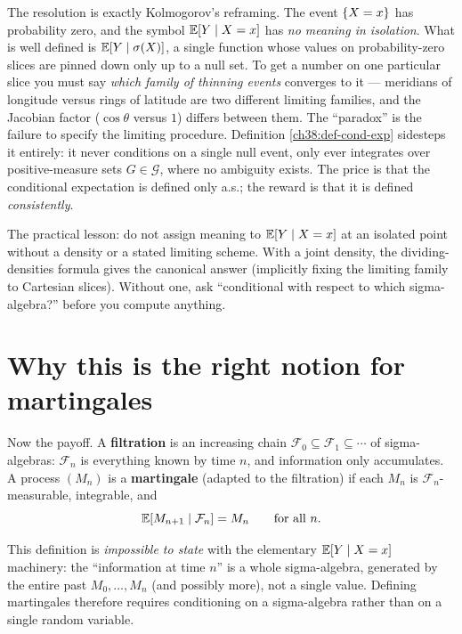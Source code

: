 \begin{whybox}[Resolving it]
The resolution is exactly Kolmogorov's reframing. The event $\{X = x\}$ has probability zero, and
the symbol $\operatorname{\mathbb{E}}[Y \mid X = x]$ has \emph{no meaning in isolation}. What is well defined is
$\operatorname{\mathbb{E}}[Y\mid\sigma(X)]$, a single function whose values on probability-zero slices are pinned down only
up to a null set. To get a number on one particular slice you must say \emph{which family of thinning
events} converges to it --- meridians of longitude versus rings of latitude are two different limiting
families, and the Jacobian factor ($\cos\theta$ versus $1$) differs between them. The ``paradox'' is
the failure to specify the limiting procedure. Definition \ref{ch38:def-cond-exp} sidesteps it
entirely: it never conditions on a single null event, only ever integrates over positive-measure sets
$G \in \mathcal{G}$, where no ambiguity exists. The price is that the conditional expectation is
defined only a.s.; the reward is that it is defined \emph{consistently}.
\end{whybox}

\begin{trapbox}
The practical lesson: do not assign meaning to $\operatorname{\mathbb{E}}[Y\mid X = x]$ at an isolated point without a
density or a stated limiting scheme. With a joint density, the dividing-densities formula gives the
canonical answer (implicitly fixing the limiting family to Cartesian slices). Without
one, ask ``conditional with respect to which sigma-algebra?'' before you compute anything.
\end{trapbox}

\section{Why this is the right notion for martingales}
\label{ch38:martingales}

Now the payoff. A \textbf{filtration} is an increasing chain $\mathcal{F}_0 \subseteq \mathcal{F}_1
\subseteq \cdots$ of sigma-algebras: $\mathcal{F}_n$ is everything known by time $n$, and information
only accumulates. A process $(M_n)$ is a \textbf{martingale} (adapted to the filtration) if each $M_n$
is $\mathcal{F}_n$-measurable, integrable, and
\begin{equation}
\label{ch38:martingale-def}
  \operatorname{\mathbb{E}}[M_{n+1} \mid \mathcal{F}_n] = M_n \qquad \text{for all } n.
\end{equation}

This definition is \emph{impossible to state} with the elementary $\operatorname{\mathbb{E}}[Y\mid X = x]$ machinery: the
``information at time $n$'' is a whole sigma-algebra, generated by the entire past $M_0, \dots, M_n$
(and possibly more), not a single value. Defining martingales therefore requires conditioning on a sigma-algebra
rather than on a single random variable.

